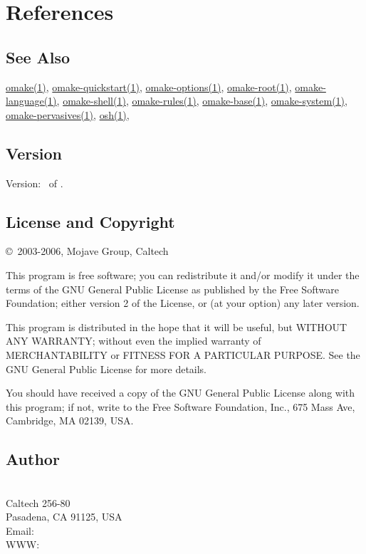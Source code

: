 %
%
\section{References}

\subsection{See Also}

\href{omake.html}{omake(1)},
\href{omake-quickstart.html}{omake-quickstart(1)},
\href{omake-options.html}{omake-options(1)},
\href{omake-root.html}{omake-root(1)},
\href{omake-language.html}{omake-language(1)},
\href{omake-shell.html}{omake-shell(1)},
\href{omake-rules.html}{omake-rules(1)},
\href{omake-base.html}{omake-base(1)},
\href{omake-system.html}{omake-system(1)},
\href{omake-pervasives.html}{omake-pervasives(1)},
\href{osh.html}{osh(1)},

\subsection{Version}

Version: \Version\ of \Date.

\subsection{License and Copyright}

\copyright\ 2003-2006, Mojave Group, Caltech

This program is free software; you can redistribute it and/or
modify it under the terms of the GNU General Public License
as published by the Free Software Foundation; either version 2
of the License, or (at your option) any later version.

This program is distributed in the hope that it will be useful,
but WITHOUT ANY WARRANTY; without even the implied warranty of
MERCHANTABILITY or FITNESS FOR A PARTICULAR PURPOSE.  See the
GNU General Public License for more details.

You should have received a copy of the GNU General Public License
along with this program; if not, write to the Free Software
Foundation, Inc., 675 Mass Ave, Cambridge, MA 02139, USA.

\subsection{Author}

\noindent
\authors					\\
Caltech 256-80					\\
Pasadena, CA 91125, USA				\\
Email: 		\\
WWW: 

